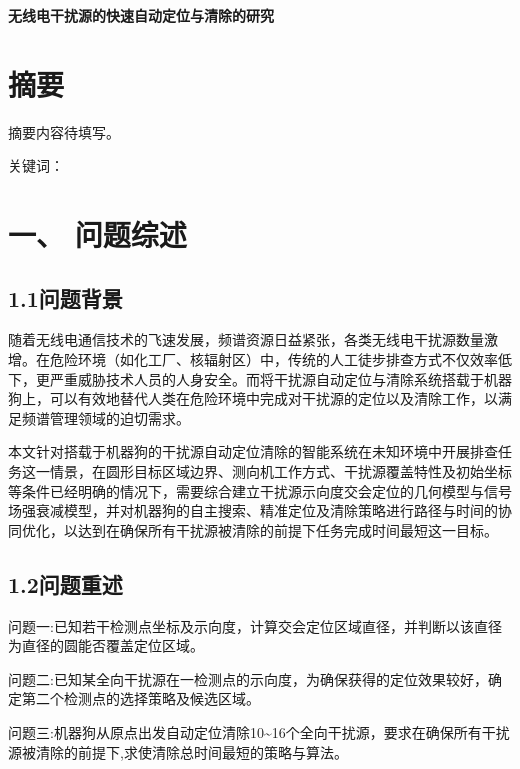 \documentclass[UTF8, zihao=5,AutoFakeBold=2]{ctexart}
\begin{document}
\newpage

	{\centering
	{\bfseries 无线电干扰源的快速自动定位与清除的研究} \\[0.5cm]

	\section*{摘要}

	}

摘要内容待填写。

	\vspace{1cm}
	{\heiti 关键词：}

\newpage
\section*{一、 问题综述}
	\subsection*{1.1问题背景}
	随着无线电通信技术的飞速发展，频谱资源日益紧张，各类无线电干扰源数量激增。在危险环境（如化工厂、核辐射区）中，传统的人工徒步排查方式不仅效率低下，更严重威胁技术人员的人身安全。而将干扰源自动定位与清除系统搭载于机器狗上，可以有效地替代人类在危险环境中完成对干扰源的定位以及清除工作，以满足频谱管理领域的迫切需求。
	
	本文针对搭载于机器狗的干扰源自动定位清除的智能系统在未知环境中开展排查任务这一情景，在圆形目标区域边界、测向机工作方式、干扰源覆盖特性及初始坐标等条件已经明确的情况下，需要综合建立干扰源示向度交会定位的几何模型与信号场强衰减模型，并对机器狗的自主搜索、精准定位及清除策略进行路径与时间的协同优化，以达到在确保所有干扰源被清除的前提下任务完成时间最短这一目标。
	
	\subsection*{1.2问题重述}
	
		问题一:\quad 已知若干检测点坐标及示向度，计算交会定位区域直径，并判断以该直径为直径的圆能否覆盖定位区域。
		
		问题二:\quad 已知某全向干扰源在一检测点的示向度，为确保获得的定位效果较好，确定第二个检测点的选择策略及候选区域。
		
		问题三:\quad 机器狗从原点出发自动定位清除10\textasciitilde16个全向干扰源，要求在确保所有干扰源被清除的前提下,求使清除总时间最短的策略与算法。
		
\end{document}
